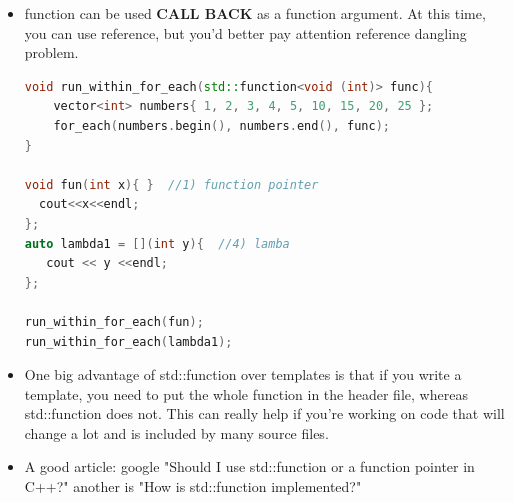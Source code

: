 \documentclass[a4paper,12pt,twoside]{book}
\begin{document}
\begin{itemize}
\item function can be used \textbf{CALL BACK} as a function argument. At this time, you can use reference, but you'd better pay attention reference dangling problem. 

\begin{lstlisting}[frame=single, language=c++]
void run_within_for_each(std::function<void (int)> func){
    vector<int> numbers{ 1, 2, 3, 4, 5, 10, 15, 20, 25 };
    for_each(numbers.begin(), numbers.end(), func);
}

void fun(int x){ }  //1) function pointer
  cout<<x<<endl;
};
auto lambda1 = [](int y){  //4) lamba
   cout << y <<endl;
};

run_within_for_each(fun);
run_within_for_each(lambda1);
\end{lstlisting}


\item One big advantage of std::function over templates is that if you write a template, you need to put the whole function in the header file, whereas std::function does not. This can really help if you're working on code that will change a lot and is included by many source files.

\item A good article: google "Should I use std::function or a function pointer in C++?" another is "How is std::function implemented?"

\end{itemize}
\end{document}
